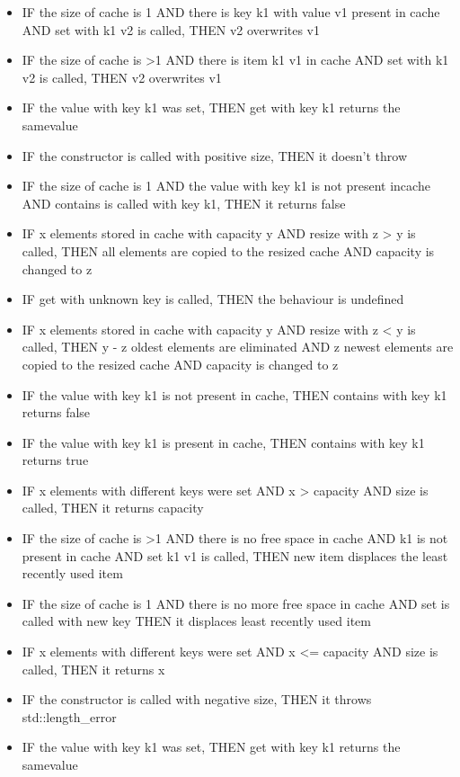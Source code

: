 \begin{itemize}
	\item IF the size of cache is 1 AND there is key k1 with value v1 present in cache AND set with k1 v2 is called, THEN v2 overwrites v1
	\item IF the size of cache is >1 AND there is item k1 v1 in cache AND set with k1 v2 is called, THEN v2 overwrites v1
	\item IF the value with key k1 was set, THEN get with key k1 returns the samevalue
	\item IF the constructor is called with positive size, THEN it doesn't throw
	\item IF the size of cache is 1 AND the value with key k1 is not present incache AND contains is called with key k1, THEN it returns false
	\item IF x elements stored in cache with capacity y AND resize with z > y is called, THEN all elements are copied to the resized cache AND capacity is changed to z
	\item IF get with unknown key is called, THEN the behaviour is undefined
	\item IF x elements stored in cache with capacity y AND resize with z < y is called, THEN y - z oldest elements are eliminated AND z newest elements are copied to the resized cache AND capacity is changed to z
	\item IF the value with key k1 is not present in cache, THEN contains with key k1 returns false
	\item IF the value with key k1 is present in cache, THEN contains with key k1 returns true
	\item IF x elements with different keys were set AND x > capacity AND size is called, THEN it returns capacity
	\item IF the size of cache is >1 AND there is no free space in cache AND k1 is not present in cache AND set k1 v1 is called, THEN new item displaces the least recently used item
	\item IF the size of cache is 1 AND there is no more free space in cache AND set is called with new key THEN it displaces least recently used item
	\item IF x elements with different keys were set AND x <= capacity AND size is called, THEN it returns x
	\item IF the constructor is called with negative size, THEN it throws std::length\_error
	\item IF the value with key k1 was set, THEN get with key k1 returns the samevalue

\end{itemize}
